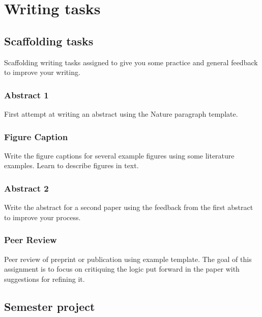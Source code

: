 \documentclass[11pt,]{article}
\begin{document}
\newpage

\hypertarget{writing-tasks}{%
\section{Writing tasks}\label{writing-tasks}}

\hypertarget{scaffolding-tasks}{%
\subsection{Scaffolding tasks}\label{scaffolding-tasks}}

Scaffolding writing tasks assigned to give you some practice and general
feedback to improve your writing.

\hypertarget{abstract-1}{%
\subsubsection{Abstract 1}\label{abstract-1}}

First attempt at writing an abstract using the Nature paragraph
template.

\hypertarget{figure-caption}{%
\subsubsection{Figure Caption}\label{figure-caption}}

Write the figure captions for several example figures using some
literature examples. Learn to describe figures in text.

\hypertarget{abstract-2}{%
\subsubsection{Abstract 2}\label{abstract-2}}

Write the abstract for a second paper using the feedback from the first
abstract to improve your process.

\hypertarget{peer-review}{%
\subsubsection{Peer Review}\label{peer-review}}

Peer review of preprint or publication using example template. The goal
of this assignment is to focus on critiquing the logic put forward in
the paper with suggestions for refining it.

\hypertarget{semester-project}{%
\subsection{Semester project}\label{semester-project}}
\end{document}
